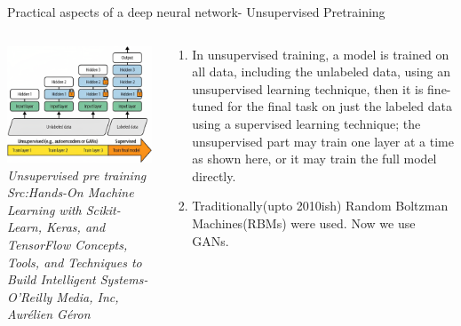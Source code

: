 \begin{frame}{Practical aspects of a deep neural network- Unsupervised Pretraining}
	\begin{columns}[T]
        \begin{column}{0.4\textwidth}
        	\includegraphics[width=\textwidth]{images/unsupervised pretraining.png}
			\tiny{\textit{Unsupervised pre training\\ Src:Hands-On Machine Learning with Scikit-Learn, Keras, and TensorFlow  Concepts, Tools, and Techniques to Build Intelligent Systems-O'Reilly Media, Inc, Aurélien Géron}}
        \end{column}
	    \begin{column}{0.6\textwidth} 
			\begin{enumerate}[$\bullet$]
				\item In unsupervised training, a model is trained on all data, including the unlabeled data,
				using an unsupervised learning technique, then it is fine-tuned for the final task on just the labeled data
				using a supervised learning technique; the unsupervised part may train one layer at a time as shown
				here, or it may train the full model directly.
				\item Traditionally(upto 2010ish) Random Boltzman Machines(RBMs) were used. Now we use GANs.
			\end{enumerate}
    	\end{column}
    \end{columns}
\end{frame}


